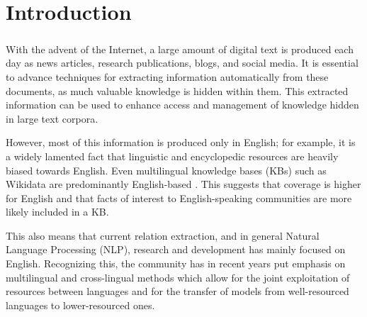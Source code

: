 \chapter{Introduction}
\paragraph{}

With the advent of the Internet, a large amount of digital text is produced each day as news articles, research publications, blogs, and social media. It is essential to advance techniques for extracting information automatically from these documents, as much valuable knowledge is hidden within them. This extracted information can be used to enhance access and management of knowledge hidden in large text corpora. 

However, most of this information is produced only in English; for example, it is a widely lamented fact that linguistic and encyclopedic resources are heavily biased towards English. Even multilingual knowledge bases (KBs) such as Wikidata \citep{vwikidata} are predominantly English-based \citep{Kaffee:Simperl:18}. This suggests that coverage is higher for English and that facts of interest to English-speaking communities are more likely included in a KB.

This also means that current relation extraction, and in general Natural Language Processing (NLP), research and development has mainly focused on English. Recognizing this, the community has in recent years put emphasis on multilingual and cross-lingual methods which allow for the joint exploitation of resources between languages and for the transfer of models from well-resourced languages to lower-resourced ones.

